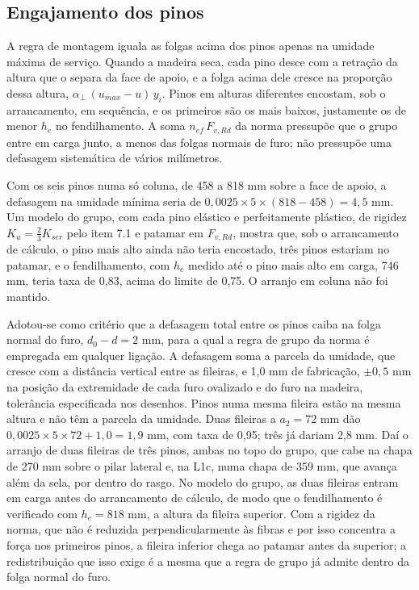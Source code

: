 \subsection{Engajamento dos pinos}\label{ssec:engajamento-pinos}

A regra de montagem iguala as folgas acima dos pinos apenas na umidade máxima de
serviço. Quando a madeira seca, cada pino desce com a retração da altura que o
separa da face de apoio, e a folga acima dele cresce na proporção dessa altura,
$\alpha_\perp\,(u_{max} - u)\,y_i$. Pinos em alturas diferentes encostam, sob
o arrancamento, em sequência, e os primeiros são os mais baixos, justamente os de
menor $h_e$ no fendilhamento. A soma $n_{ef}\,F_{v,Rd}$ da norma pressupõe que o
grupo entre em carga junto, a menos das folgas normais de furo; não pressupõe
uma defasagem sistemática de vários milímetros.

Com os seis pinos numa só coluna, de 458 a 818 mm sobre a face de apoio, a
defasagem na umidade mínima seria de
$0{,}0025 \times 5 \times (818 - 458) = 4{,}5$ mm. Um modelo do grupo, com cada
pino elástico e perfeitamente plástico, de rigidez $K_u = \frac{2}{3}K_{ser}$
pelo item 7.1 e patamar em $F_{v,Rd}$, mostra que, sob o arrancamento de cálculo,
o pino mais alto ainda não teria encostado, três pinos estariam no patamar, e o
fendilhamento, com $h_e$ medido até o pino mais alto em carga, 746 mm, teria
taxa de 0,83, acima do limite de 0,75. O arranjo em coluna não foi mantido.

Adotou-se como critério que a defasagem total entre os pinos caiba na folga
normal do furo, $d_0 - d = 2$ mm, para a qual a regra de grupo da norma é
empregada em qualquer ligação. A defasagem soma a parcela da umidade, que cresce
com a distância vertical entre as fileiras, e 1,0 mm de fabricação, $\pm 0{,}5$ mm
na posição da extremidade de cada furo ovalizado e do furo na madeira, tolerância
especificada nos desenhos. Pinos numa mesma fileira estão na mesma altura e não
têm a parcela da umidade. Duas fileiras a $a_2 = 72$ mm dão
$0{,}0025 \times 5 \times 72 + 1{,}0 = 1{,}9$ mm, com taxa de 0,95; três já
dariam 2,8 mm. Daí o arranjo de duas fileiras de três pinos, ambas no topo do
grupo, que cabe na chapa de 270 mm sobre o pilar lateral e, na L1c, numa chapa de
359 mm, que avança além da sela, por dentro do rasgo. No modelo do grupo, as duas
fileiras entram em carga antes do arrancamento de cálculo, de modo que o
fendilhamento é verificado com $h_e = 818$ mm, a altura da fileira superior. Com
a rigidez da norma, que não é reduzida perpendicularmente às fibras e por isso
concentra a força nos primeiros pinos, a fileira inferior chega ao patamar antes
da superior; a redistribuição que isso exige é a mesma que a regra de grupo já
admite dentro da folga normal do furo.

